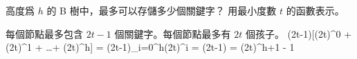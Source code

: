 \startEXERCISE
高度爲 $h$ 的 B 樹中，最多可以存儲多少個關鍵字？
用最小度數 $t$ 的函數表示。
\stopEXERCISE

\startANSWER
每個節點最多包含 $2t-1$ 個關鍵字。每個節點最多有 $2t$ 個孩子。
\startsplitformula\startmathalignment
\NC \NC (2t-1)[(2t)^0 + (2t)^1 + \ldots + (2t)^h] \NR
\NC = \NC (2t-1)\sum_{i=0}^{h}(2t)^i \NR
\NC = \NC (2t-1) \NR
\NC = \NC (2t)^{h+1} - 1 \NR
\stopmathalignment\stopsplitformula
\stopANSWER
